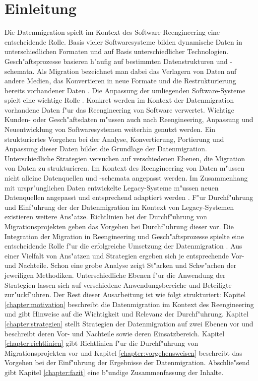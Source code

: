 \section{Einleitung}
\label{chapter:einleitung}


Die Datenmigration spielt im Kontext des Software-Reengineering eine entscheidende Rolle. Basis vieler Softwaresysteme bilden dynamische Daten in unterschiedlichen Formaten und auf Basis unterschiedlicher Technologien. Gesch"aftsprozesse basieren h"aufig auf bestimmten Datenstrukturen und -schemata. Als Migration bezeichnet man dabei das Verlagern von Daten auf andere Medien, das Konvertieren in neue Formate und die Restrukturierung bereits vorhandener Daten \citep{morris-2012}. Die Anpassung der umliegenden Software-Systeme spielt eine wichtige Rolle \cite{henrard-2002}.
\lb
Konkret werden im Kontext der Datenmigration vorhandene Daten f"ur das Reengineering von Software verwertet. Wichtige Kunden- oder Gesch"aftsdaten m"ussen auch nach Reengineering, Anpassung und Neuentwicklung von Softwaresystemen weiterhin genutzt werden. Ein strukturiertes Vorgehen bei der Analyse, Konvertierung, Portierung und Anpassung dieser Daten bildet die Grundlage der Datenmigration.  
\lb
Unterschiedliche Strategien versuchen auf verschiedenen Ebenen, die Migration von Daten zu strukturieren. Im Kontext des Reengineering von Daten m"ussen nicht alleine Datenquellen und -schemata angepasst werden. Im Zusammenhang mit urspr"unglichen Daten entwickelte Legacy-Systeme m"ussen neuen Datenquellen angepasst und entsprechend adaptiert werden \citep{henrard-2002}.	
\lb
F"ur Durchf"uhrung und Einf"uhrung der der Datenmigration im Kontext von Legacy-Systemen existieren weitere Ans"atze. Richtlinien bei der Durchf"uhrung von Migrationsprojekten geben das Vorgehen bei Durchf"uhrung dieser vor. Die Integration der Migration in Reengineering und Gesch"aftsprozesse spielte eine entscheidende Rolle f"ur die erfolgreiche Umsetzung der Datenmigration \citep{wuLawless-1997} \citep{ackermann-2005}.
\lb
Aus einer Vielfalt von Ans"atzen und Strategien ergeben sich je entsprechende Vor- und Nachteile. Schon eine grobe Analyse zeigt St"arken und Schw"achen der jeweiligen Methodiken. Unterschiedliche Ebenen f"ur die Anwendung der Strategien lassen sich auf verschiedene Anwendungsbereiche und Beteiligte zur"uckf"uhren.
\lb
Der Rest dieser Ausarbeitung ist wie folgt strukturiert: Kapitel \ref{chapter:motivation} beschreibt die Datenmigration im Kontext des Reengineering und gibt Hinweise auf die Wichtigkeit und Relevanz der Durchf"uhrung. Kapitel \ref{chapter:strategien} stellt Strategien der Datenmigration auf zwei Ebenen vor und beschreibt deren Vor- und Nachteile sowie deren Einsatzbereich. Kapitel \ref{chapter:richtlinien} gibt Richtlinien f"ur die Durchf"uhrung von Migrationsprojekten vor und Kapitel \ref{chapter:vorgehensweisen} beschreibt das Vorgehen bei der Einf"uhrung der Ergebnisse der Datenmigration. Abschlie"send gibt Kapitel \ref{chapter:fazit} eine b"undige Zusammenfassung der Inhalte.